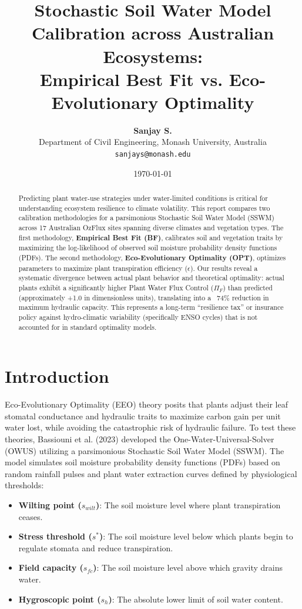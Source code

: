 \documentclass[11pt,a4paper]{article}
\title{\textbf{Stochastic Soil Water Model Calibration across Australian Ecosystems:\\ Empirical Best Fit vs. Eco-Evolutionary Optimality}}
\author{\textbf{Sanjay S.} \\ Department of Civil Engineering, Monash University, Australia \\ \texttt{sanjays@monash.edu}}
\date{\today}
\begin{document}
\maketitle

\begin{abstract}
Predicting plant water-use strategies under water-limited conditions is critical for understanding ecosystem resilience to climate volatility. This report compares two calibration methodologies for a parsimonious Stochastic Soil Water Model (SSWM) across 17 Australian OzFlux sites spanning diverse climates and vegetation types. The first methodology, \textbf{Empirical Best Fit (BF)}, calibrates soil and vegetation traits by maximizing the log-likelihood of observed soil moisture probability density functions (PDFs). The second methodology, \textbf{Eco-Evolutionary Optimality (OPT)}, optimizes parameters to maximize plant transpiration efficiency ($\epsilon$). Our results reveal a systematic divergence between actual plant behavior and theoretical optimality: actual plants exhibit a significantly higher Plant Water Flux Control ($\Pi_F$) than predicted (approximately +1.0 in dimensionless units), translating into a ~74\% reduction in maximum hydraulic capacity. This represents a long-term ``resilience tax'' or insurance policy against hydro-climatic variability (specifically ENSO cycles) that is not accounted for in standard optimality models.
\end{abstract}

\section{Introduction}
Eco-Evolutionary Optimality (EEO) theory posits that plants adjust their leaf stomatal conductance and hydraulic traits to maximize carbon gain per unit water lost, while avoiding the catastrophic risk of hydraulic failure. To test these theories, Bassiouni et al. (2023) developed the One-Water-Universal-Solver (OWUS) utilizing a parsimonious Stochastic Soil Water Model (SSWM). The model simulates soil moisture probability density functions (PDFs) based on random rainfall pulses and plant water extraction curves defined by physiological thresholds:
\begin{itemize}
    \item \textbf{Wilting point ($s_{wilt}$)}: The soil moisture level where plant transpiration ceases.
    \item \textbf{Stress threshold ($s^*$)}: The soil moisture level below which plants begin to regulate stomata and reduce transpiration.
    \item \textbf{Field capacity ($s_{fc}$)}: The soil moisture level above which gravity drains water.
    \item \textbf{Hygroscopic point ($s_h$)}: The absolute lower limit of soil water content.
\end{itemize}
\end{document}
